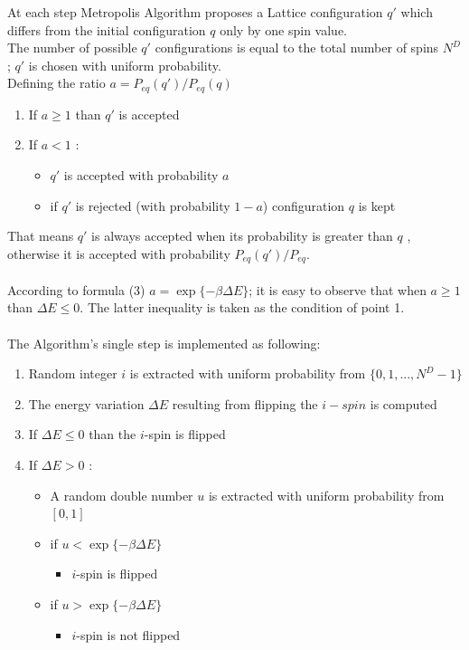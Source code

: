 \documentclass[11pt,a4paper]{article}
\begin{document}
At each step Metropolis Algorithm proposes a Lattice configuration $q'$ which differs from the initial configuration $q$ only by one spin value.\\ 
The number of possible $q'$ configurations is equal to the total number of spins $N^D$; $q'$ is chosen with uniform probability.
\\Defining the ratio $a = P_{eq}(q')/P_{eq}(q)$ 
\begin{enumerate}
	\item If $a \geq 1$ than $q'$ is accepted 
	\item If $a < 1$ :
		\begin{itemize}
			\item[] $q'$ is accepted with probability $a$
			\item[] if $q'$ is rejected (with probability $1-a$) configuration $q$ is kept
		\end{itemize}				 
\end{enumerate}
That means $q'$ is always accepted when its probability is greater than $q$ , otherwise it is accepted with 
probability $P_{eq}(q')/P_{eq}$.\\
\\
According to formula (3) $a = \exp \lbrace -\beta  \Delta E  \rbrace$; it is easy to observe that when $a \geq 1$ than $ \Delta E \leq 0 $. The latter inequality is taken as the condition of point 1.  
\\
\\
The Algorithm's single step is implemented as following:
	
\begin{enumerate}
	
	\item Random integer $i$ is extracted with uniform probability from $\{0,1,...,N^D -1\}$
	\item The energy variation $ \Delta E $ resulting from flipping the $i-spin$ is computed		
	\item If $\Delta E \leq 0 $ than the $i$-spin is flipped
	\item If $\Delta E > 0 $ :
		\begin{itemize}
			\item[]  A random double number $u$ is extracted with uniform probability from $[0,1]$
			\item[]	 if $u < \exp \lbrace -\beta  \Delta E  \rbrace $					
			\begin{itemize}
				\item[] $i$-spin is flipped 
			\end{itemize}				 	 
			\item[]	 if $u > \exp \lbrace -\beta  \Delta E  \rbrace $
			\begin{itemize}
				\item[] $i$-spin is not flipped 
			\end{itemize}					
		\end{itemize}				 
\end{enumerate}
\newpage
\end{document}
